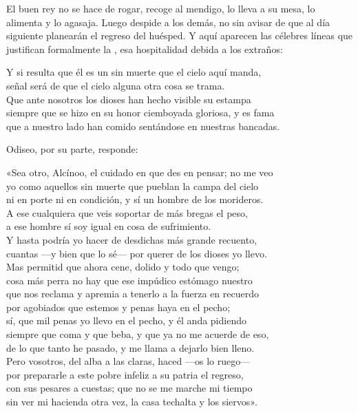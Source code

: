 El buen rey no se hace de rogar, recoge al mendigo, lo lleva a su mesa, lo alimenta y lo agasaja. Luego despide a los demás, no sin avisar de que al día siguiente planearán el regreso del huésped. Y aquí aparecen las célebres líneas que justifican formalmente la , esa hospitalidad debida a los extraños:

\begin{versocita}
Y si resulta que él es un sin muerte que el cielo aquí manda,\\
señal será de que el cielo alguna otra cosa se trama.\\
Que ante nosotros los dioses han hecho visible su estampa\\
siempre que se hizo en su honor ciemboyada gloriosa, y es fama\\
que a nuestro lado han comido sentándose en nuestras bancadas.
\end{versocita}

Odiseo, por su parte, responde:

\begin{versocita}
«Sea otro, Alcínoo, el cuidado en que des en pensar; no me veo\\
yo como aquellos sin muerte que pueblan la campa del cielo\\
ni en porte ni en condición, y sí un hombre de los morideros.\\
A ese cualquiera que veis soportar de más bregas el peso,\\
a ese hombre sí soy igual en cosa de sufrimiento.\\
\stanzabreak
Y hasta podría yo hacer de desdichas más grande recuento,\\
cuantas ---y bien que lo sé--- por querer de los dioses yo llevo.\\
Mas permitid que ahora cene, dolido y todo que vengo;\\
cosa más perra no hay que ese impúdico estómago nuestro\\
que nos reclama y apremia a tenerlo a la fuerza en recuerdo\\
por agobiados que estemos y penas haya en el pecho;\\
sí, que mil penas yo llevo en el pecho, y él anda pidiendo\\
siempre que coma y que beba, y que ya no me acuerde de eso,\\
de lo que tanto he pasado, y me llama a dejarlo bien lleno.\\
\stanzabreak
Pero vosotros, del alba a las claras, haced ---os lo ruego---\\
por prepararle a este pobre infeliz a su patria el regreso,\\
con sus pesares a cuestas; que no se me marche mi tiempo\\
sin ver mi hacienda otra vez, la casa techalta y los siervos».
\end{versocita}

